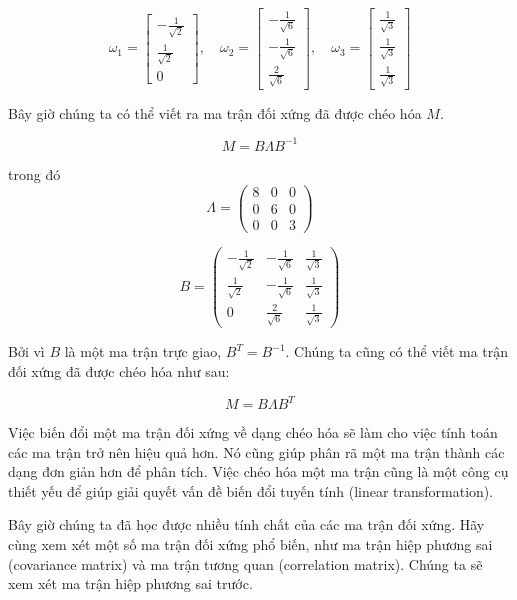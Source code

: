 \[\omega_{1}=\begin{bmatrix} -\frac{1}{\sqrt{2}} \\ \frac{1}{\sqrt{2}}\\ 0 \end{bmatrix}, \quad \omega_{2}=\begin{bmatrix} -\frac{1}{\sqrt{6}} \\ - \frac{1}{\sqrt{6}}\\ \frac{2}{\sqrt{6}} \end{bmatrix}, \quad \omega_{3}=\begin{bmatrix} \frac{1}{\sqrt{3}} \\ \frac{1}{\sqrt{3}}\\ \frac{1}{\sqrt{3}} \end{bmatrix}\]

Bây giờ chúng ta có thể viết ra ma trận đối xứng đã được chéo hóa $M$.

\[M = B \Lambda B^{-1}\]

trong đó \[\Lambda = \begin{pmatrix} 8 & 0 & 0 \\ 0 & 6 & 0 \\ 0 & 0 & 3 \end{pmatrix}\]

\[B = \begin{pmatrix} -\frac{1}{\sqrt{2}} & -\frac{1}{\sqrt{6}} & \frac{1}{\sqrt{3}} \\ \frac{1}{\sqrt{2}} & -\frac{1}{\sqrt{6}} & \frac{1}{\sqrt{3}} \\ 0 & \frac{2}{\sqrt{6}} & \frac{1}{\sqrt{3}} \end{pmatrix}\]

Bởi vì $B$ là một ma trận trực giao, $B^{T}=B^{-1}$. Chúng ta cũng có thể viết ma trận đối xứng đã được chéo hóa như sau:

\[M = B \Lambda B^{T}\]

Việc biến đổi một ma trận đối xứng về dạng chéo hóa sẽ làm cho việc tính toán các ma trận trở nên hiệu quả hơn. Nó cũng giúp phân rã một ma trận thành các dạng đơn giản hơn để phân tích. Việc chéo hóa một ma trận cũng là một công cụ thiết yếu để giúp giải quyết vấn đề biến đổi tuyến tính (linear transformation).

Bây giờ chúng ta đã học được nhiều tính chất của các ma trận đối xứng. Hãy cùng xem xét một số ma trận đối xứng phổ biến, như ma trận hiệp phương sai (covariance matrix) và ma trận tương quan (correlation matrix). Chúng ta sẽ xem xét ma trận hiệp phương sai trước.

